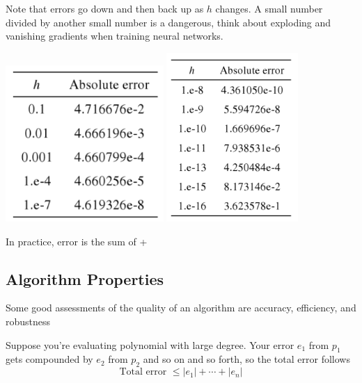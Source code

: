\documentclass[12pt]{scrartcl}
\begin{document}
\begin{note}
    
  Note that errors go down and then back up as $h$ changes. A small number divided by another small number is a dangerous,
  think about exploding and vanishing gradients when training neural networks.

  \includegraphics[width=6cm]{good.png}
  \includegraphics[width=5cm]{bad.png}
  
\end{note}

\begin{note}
  In practice, error is the sum of  + 
\end{note}

\subsection{Algorithm Properties}

Some good assessments of the quality of an algorithm are accuracy, efficiency, and robustness

\begin{definition}
  Suppose you're evaluating polynomial with large degree. Your error $e_1$ from $p_1$ gets compounded 
  by $e_2$ from $p_2$ and so on and so forth, so the total error follows
  \[\text{Total error } \leq |e_1| + \cdots + |e_n|\]
\end{definition}
\end{document}
